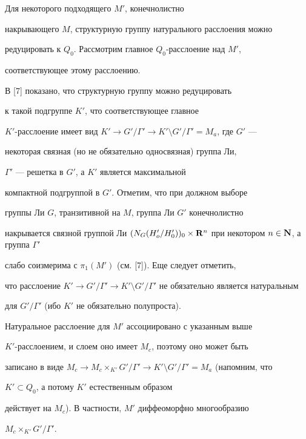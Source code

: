 \begin{pf}


Для некоторого подходящего $M'$, конечнолистно


накрывающего $M$, структурную группу натурального расслоения можно


редуцировать к $Q_0$. Рассмотрим главное $Q_0$-расслоение над $M'$,


соответствующее этому расслоению.


В [7] показано, что структурную группу можно редуцировать


к такой подгруппе $K'$, что соответствующее главное


$K'$-расслоение имеет вид $K' \to G'/\Gamma' \to


K' \setminus G' / \Gamma' = M_a$, где $G'$ ---


некоторая связная (но не обязательно односвязная) группа Ли,


$\Gamma'$ --- решетка в $G'$, а $K'$ является максимальной


компактной подгруппой в $G'$. Отметим, что при должном выборе


группы Ли $G$, транзитивной на $M$, группа Ли $G'$ конечнолистно


накрывается связной группой Ли $(N_G (H_o' / H_0'))_0 \times


\bold R ^n$ при некотором $n \in \bold N$, а группа $\Gamma'$


слабо соизмерима с $\pi_1 (M')$ (см. [7]). Еще следует отметить,


что расслоение $K' \to G'/\Gamma' \to K'


\setminus G' /\Gamma'$ не обязательно является натуральным


для $G' /\Gamma'$ (ибо $K'$ не обязательно полупроста).





Натуральное расслоение для $M'$ ассоциировано с указанным выше


$K'$-расслоением, и слоем оно имеет $M_c$, поэтому оно может быть


записано в виде $M_c \to M_c \times_{K'} G'/\Gamma'


\to K' \setminus G' /\Gamma' =M_a$ (напомним, что


$K' \subset Q_0$, а потому $K'$ естественным образом


действует на $M_c$). В частности, $M'$ диффеоморфно многообразию


$M_c \times _{K'} G' /\Gamma'$.






\end{pf}
